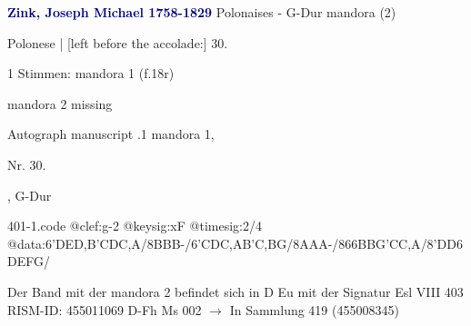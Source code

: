 \documentclass[twocolumn]{book}
\begin{document}
\newline \par \vspace{7pt} \textcolor{darkblue}{\textbf{Zink, Joseph Michael  1758-1829}}
\newline Polonaises - G-Dur
\newline mandora (2)
\newline \begin{itshape}[f.18r, at left:] Polonese | [left before the accolade:] 30.\end{itshape} 
\newline \textcolor{darkblue}{}  1 Stimmen: mandora 1  (f.18r)
\newline \begin{small} mandora 2 missing\end{small} 
\newline Autograph manuscript
.1  mandora 1, \begin{itshape}Nr. 30.\end{itshape}, G-Dur  
\begin{filecontents*}{401-1.code}
@clef:g-2
@keysig:xF
@timesig:2/4
@data:6'DED,B'CDC,A/8BBB-/6'CDC,AB'C,BG/8AAA-/866{BBG}{'CC,A}/8'DD{6DE}{FG}/
\end{filecontents*}
\newline
%
\newline Der Band mit der mandora 2 befindet sich in D Eu mit der Signatur Esl VIII 403
\newline RISM-ID: 455011069
\newline D-Fh  Ms 002
\newline $\rightarrow$ In Sammlung 419 (455008345)
      
\end{document}
